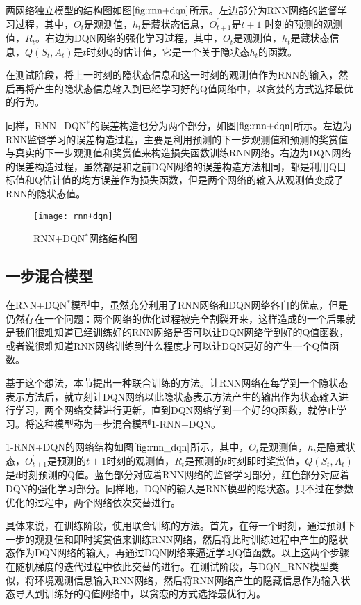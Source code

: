 两网络独立模型的结构图如图$\ref{fig:rnn+dqn}$所示。左边部分为RNN网络的监督学习过程，其中，$O_{t}$是观测值，$h_{t}$是藏状态信息，$O_{t+1}^{'}$是$t+1$ 时刻的预测的观测值，$R_{t}$。右边为DQN网络的强化学习过程，其中，$O_{t}$是观测值，$h_{t}$是藏状态信息，$Q(S_{t},A_{t})$是$t$时刻Q的估计值，它是一个关于隐状态$h_{t}$的函数。

在测试阶段，将上一时刻的隐状态信息和这一时刻的观测值作为RNN的输入，然后再将产生的隐状态信息输入到已经学习好的Q值网络中，以贪婪的方式选择最优的行为。

同样，RNN+DQN$^{*}$的误差构造也分为两个部分，如图$\ref{fig:rnn+dqn}$所示。左边为RNN监督学习的误差构造过程，主要是利用预测的下一步观测值和预测的奖赏值与真实的下一步观测值和奖赏值来构造损失函数训练RNN网络。右边为DQN网络的误差构造过程，虽然都是和之前DQN网络的误差构造方法相同，都是利用Q目标值和Q估计值的均方误差作为损失函数，但是两个网络的输入从观测值变成了RNN的隐状态值。

\begin{figure}[htbp]
\centering
\texttt{[image: rnn+dqn]}
\caption{RNN+DQN$^{*}$网络结构图}
\label{fig:rnn+dqn}
\end{figure}

\subsection{一步混合模型}
在RNN+DQN$^{*}$模型中，虽然充分利用了RNN网络和DQN网络各自的优点，但是仍然存在一个问题：两个网络的优化过程被完全割裂开来，这样造成的一个后果就是我们很难知道已经训练好的RNN网络是否可以让DQN网络学到好的Q值函数，或者说很难知道RNN网络训练到什么程度才可以让DQN更好的产生一个Q值函数。

基于这个想法，本节提出一种联合训练的方法。让RNN网络在每学到一个隐状态表示方法后，就立刻让DQN网络以此隐状态表示方法产生的输出作为状态输入进行学习，两个网络交替进行更新，直到DQN网络学到一个好的Q函数，就停止学习。将这种模型称为一步混合模型1-RNN+DQN。

1-RNN+DQN的网络结构如图$\ref{fig:rnn_dqn}$所示，其中，$O_{t}$是观测值，$h_{t}$是隐藏状态，$O_{t+1}^{'}$是预测的$t+1$时刻的观测值，$R_{t}$是预测的$t$时刻即时奖赏值，$Q(S_{t},A_{t})$是$t$时刻预测的Q值。蓝色部分对应着RNN网络的监督学习部分，红色部分对应着DQN的强化学习部分。同样地，DQN的输入是RNN模型的隐状态。只不过在参数优化的过程中，两个网络依次交替进行。

具体来说，在训练阶段，使用联合训练的方法。首先，在每一个时刻，通过预测下一步的观测值和即时奖赏值来训练RNN网络，然后将此时训练过程中产生的隐状态作为DQN网络的输入，再通过DQN网络来逼近学习Q值函数。以上这两个步骤在随机梯度的迭代过程中依此交替的进行。在测试阶段，与DQN\_RNN模型类似，将环境观测信息输入RNN网络，然后将RNN网络产生的隐藏信息作为输入状态导入到训练好的Q值网络中，以贪恋的方式选择最优行为。

